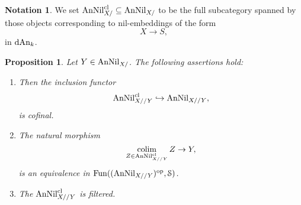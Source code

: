 \documentclass[10pt,a4paper,reqno]{amsart} %
\theoremstyle{plain}
\newtheorem{prop}[thm]{Proposition}
\theoremstyle{definition}
\newtheorem{notation}[thm]{Notation}
\theoremstyle{remark}
\numberwithin{equation}{section}
\begin{document}
\begin{notation}
    We set $\mathrm{AnNil}_{X/}^{\mathrm{cl}} \subseteq \mathrm{AnNil}_{X/}$ to be the full subcategory spanned by those objects corresponding to nil-embeddings of the form
        \[
            X \to S,  
        \]
    in $\mathrm{dAn}_k$.
\end{notation}

\begin{prop} \label{prop:analytic_FMP_under_X_are_ind_inf_schemes}
    Let $Y \in \mathrm{AnNil}_{X/}$. The following assertions hold:
    \begin{enumerate}
        \item Then the inclusion functor
            \[
              \mathrm{AnNil}^{\mathrm{cl}}_{X//Y} \hookrightarrow \mathrm{AnNil}_{X//Y} , 
            \]
        is cofinal.
        \item The natural morphism
            \[
               \operatorname*{colim}_{Z \in \mathrm{AnNil}_{X//Y}^{\mathrm{cl}}} Z \to Y,  
            \]
        is an equivalence in $\operatorname{Fun}((\mathrm{AnNil}_{X//Y})^\mathrm{op}, \mathcal S)$.
        \item The \infcat $\mathrm{AnNil}_{X//Y}^{\mathrm{cl}}$ is filtered.
    \end{enumerate}
\end{prop}
\end{document}
